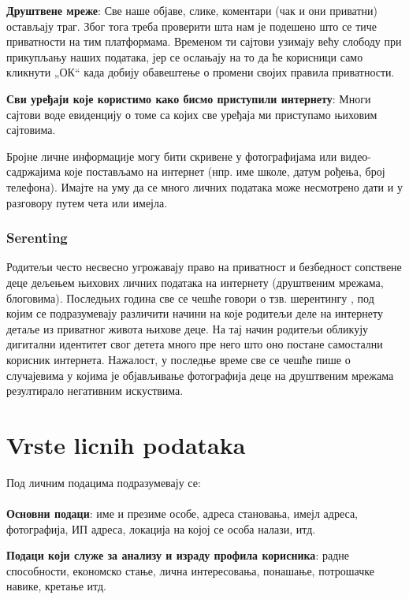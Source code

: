 \documentclass[a4paper]{article}
\begin{document}
\textbf{Друштвене мреже}:
Све наше објаве, слике, коментари (чак и они приватни) остављају траг. Због тога треба проверити шта нам је подешено што се тиче приватности на тим платформама. Временом ти сајтови узимају већу слободу при прикупљању наших података, јер се ослањају на то да ће корисници само кликнути „ОК“ када добију обавештење о промени својих правила приватности.

\textbf{Сви уређаји које користимо како бисмо приступили интернету}:
Многи сајтови воде евиденцију о томе са којих све уређаја ми приступамо њиховим сајтовима.

Бројне личне информације могу бити скривене у фотографијама или видео-садржајима које постављамо на интернет (нпр. име школе, датум рођења, број телефона). Имајте на уму да се много личних података може несмотрено дати и у разговору путем чета или имејла.
\subsubsection{Serenting}

Родитељи често несвесно угрожавају право на приватност и безбедност сопствене деце дељењем њихових личних података на интернету (друштвеним мрежама, блоговима). Последњих година све се чешће говори о тзв. шерентингу  \cite{sharenting}, под којим се подразумевају различити начини на које родитељи деле на интернету детаље из приватног живота њихове деце. На тај начин родитељи обликују дигитални идентитет  свог детета много пре него што оно постане самостални корисник интернета. Нажалост, у последње време све се чешће пише о случајевима у којима је објављивање фотографија деце на друштвеним мрежама резултирало негативним искуствима.
    

\section{Vrste licnih podataka}

Под личним подацима подразумевају се:
\paragraph{}
\textbf{Основни подаци}:
име и презиме особе, адреса становања, имејл адреса, фотографија, ИП адреса, локација на којој се особа налази, итд.

\textbf{Подаци који служе за анализу и израду профила корисника}: радне способности, економско стање, лична интересовања, понашање, потрошачке навике, кретање итд.
\end{document}
